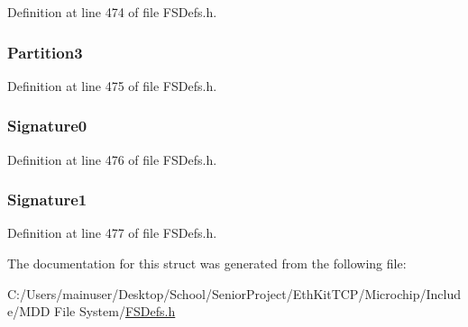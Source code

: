 Definition at line 474 of file F\+S\+Defs.\+h.

\hypertarget{struct___p_t___m_b_r_ac98d03fa0976d3921094a9ebaf38f2d5}{}
\subsubsection[{Partition3}]{ Partition3}\label{struct___p_t___m_b_r_ac98d03fa0976d3921094a9ebaf38f2d5}


Definition at line 475 of file F\+S\+Defs.\+h.

\hypertarget{struct___p_t___m_b_r_a9b49d812a9060bf0b318a52865b75d7c}{}
\subsubsection[{Signature0}]{ Signature0}\label{struct___p_t___m_b_r_a9b49d812a9060bf0b318a52865b75d7c}


Definition at line 476 of file F\+S\+Defs.\+h.

\hypertarget{struct___p_t___m_b_r_a39b5beb9c358d4403630e620e017d601}{}
\subsubsection[{Signature1}]{ Signature1}\label{struct___p_t___m_b_r_a39b5beb9c358d4403630e620e017d601}


Definition at line 477 of file F\+S\+Defs.\+h.



The documentation for this struct was generated from the following file\+:\begin{DoxyCompactItemize}
\item 
C\+:/\+Users/mainuser/\+Desktop/\+School/\+Senior\+Project/\+Eth\+Kit\+T\+C\+P/\+Microchip/\+Include/\+M\+D\+D File System/\hyperlink{_f_s_defs_8h}{F\+S\+Defs.\+h}\end{DoxyCompactItemize}

